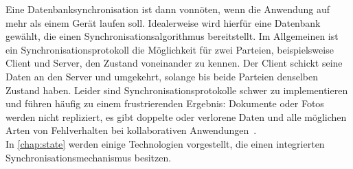 Eine Datenbanksynchronisation ist dann vonnöten, wenn die Anwendung auf mehr als einem Gerät laufen soll.
Idealerweise wird hierfür eine Datenbank gewählt, die einen Synchronisationsalgorithmus bereitstellt.
Im Allgemeinen ist ein Synchronisationsprotokoll die Möglichkeit für zwei Parteien, beispielsweise Client und Server, den Zustand voneinander zu kennen. Der Client schickt seine Daten an den Server und umgekehrt, solange bis beide Parteien denselben Zustand haben.
Leider sind Synchronisationsprotokolle schwer zu implementieren und führen häufig zu einem frustrierenden Ergebnis: Dokumente oder Fotos werden nicht repliziert, es gibt doppelte oder verlorene Daten und alle möglichen Arten von Fehlverhalten bei kollaborativen Anwendungen~\cite{sync}.\\
In \autoref{chap:state} werden einige Technologien vorgestellt, die einen integrierten Synchronisationsmechanismus besitzen.
